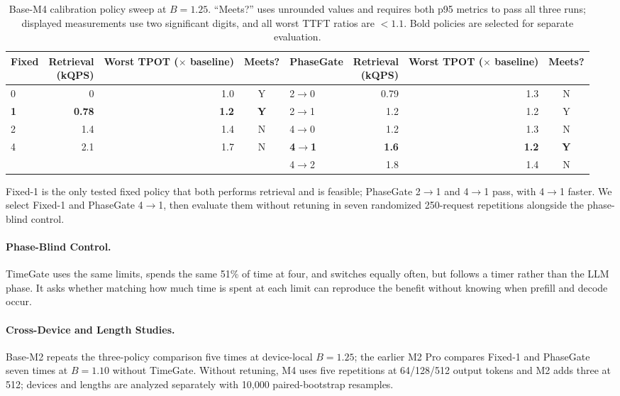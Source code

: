 \documentclass{article}
\begin{document}
\begin{table}[h]
  \caption{Base-M4 calibration policy sweep at $B=1.25$.
``Meets?'' uses unrounded values and requires both p95 metrics to pass all three runs; displayed measurements use two significant digits, and all worst TTFT ratios are $<1.1$.
Bold policies are selected for separate evaluation.}
  \label{tab:calibration}
  \centering
  \scriptsize
  \setlength{\tabcolsep}{2.3pt}
  \begin{tabular}{lrrc@{\qquad}lrrc}
    \toprule
    Fixed & \shortstack{Retrieval\\(kQPS)} & \shortstack{Worst TPOT\\($\times$ baseline)} & Meets? & PhaseGate & \shortstack{Retrieval\\(kQPS)} & \shortstack{Worst TPOT\\($\times$ baseline)} & Meets? \\
    \midrule
    0 & 0 & 1.0 & Y & 2$\rightarrow$0 & 0.79 & 1.3 & N \\
    \textbf{1} & \textbf{0.78} & \textbf{1.2} & \textbf{Y} & 2$\rightarrow$1 & 1.2 & 1.2 & Y \\
    2 & 1.4 & 1.4 & N & 4$\rightarrow$0 & 1.2 & 1.3 & N \\
    4 & 2.1 & 1.7 & N & \textbf{4$\rightarrow$1} & \textbf{1.6} & \textbf{1.2} & \textbf{Y} \\
      &      &      &   & 4$\rightarrow$2 & 1.8 & 1.4 & N \\
    \bottomrule
  \end{tabular}
\end{table}

Fixed-1 is the only tested fixed policy that both performs retrieval and is feasible; PhaseGate 2$\rightarrow$1 and 4$\rightarrow$1 pass, with 4$\rightarrow$1 faster.
We select Fixed-1 and PhaseGate 4$\rightarrow$1, then evaluate them without retuning in seven randomized 250-request repetitions alongside the phase-blind control.

\paragraph{Phase-Blind Control.}
TimeGate uses the same limits, spends the same 51\% of time at four, and switches equally often, but follows a timer rather than the LLM phase.
It asks whether matching how much time is spent at each limit can reproduce the benefit without knowing when prefill and decode occur.

\paragraph{Cross-Device and Length Studies.}
Base-M2 repeats the three-policy comparison five times at device-local $B=1.25$; the earlier M2 Pro compares Fixed-1 and PhaseGate seven times at $B=1.10$ without TimeGate.
Without retuning, M4 uses five repetitions at 64/128/512 output tokens and M2 adds three at 512; devices and lengths are analyzed separately with 10,000 paired-bootstrap resamples.
\end{document}
